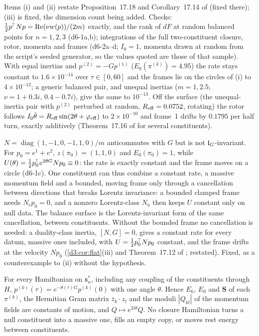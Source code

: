 Items (i) and (ii) restate Proposition~17.18 and Corollary~17.14 of \cite{ES17} (fixed there); (iii) is fixed, the dimension count being added.
Checks: $\tfrac12 p^{\!\top}Np=\operatorname{Re}(\nu w(p))/(2m)$ exactly, and the rank of $dF$ at random balanced points for $n=1,2,3$ (d6-1a,b); integrations of
the full two-constituent closure, rotor, momenta and frames (d6-2a--d; $I_0=1$, momenta drawn at random from the script's seeded generator, so
the values quoted are those of that sample). With equal inertias and $p^{(2)}=-Gp^{(1)}$ ($E_0(\pi^{(k)})=4.95$) the
rate stays constant to $1.6\times10^{-14}$ over $\tau\in[0,60]$ and the frames lie on the circles of (i) to $4\times10^{-12}$; a generic balanced
pair, and unequal inertias ($m=1,2.5$; $\nu=1+0.3i,\,0.4-0.7i$), give the same to $10^{-13}$. Off the surface (the unequal-inertia pair with $p^{(2)}$ perturbed at random, $R_{\rm eff}=0.0752$, rotating) the
rotor follows $I_0\ddot\theta=R_{\rm eff}\sin(2\theta+\varphi_{\rm eff})$ to $2\times10^{-10}$ and frame~1 drifts by $0.1795$ per half turn, exactly
additively (Theorem~17.16 of \cite{ES17} for several constituents).

\begin{remark}
\label{d6:rem:lorentzreq}
$N=\operatorname{diag}(1,-1,0,-1,1,0)/m$ anticommutes with $G$ but is not $\mathfrak l_G$-invariant. For $p_0=e^1+e^2$, $z(\pi_0)=(1,1,0)$ and
$E_0(\pi_0)=1$, while $U(\theta)=\tfrac12 p_0^{\!\top}e^{2\theta G}Np_0\equiv0$: the rate is exactly constant and the frame moves on a circle (d6-1c). One
constituent can thus combine a constant rate, a massive momentum field and a bounded, moving frame only through a cancellation between directions
that breaks Lorentz invariance: a bounded clamped frame needs $N_cp_0=0$, and a nonzero Lorentz-class $N_a$ then keeps $U$ constant only on null
data. The balance surface is the Lorentz-invariant form of the same cancellation, between constituents. Without the bounded frame no cancellation
is needed: a duality-class inertia, $[N,G]=0$, gives a constant rate for every datum, massive ones included, with $U=\tfrac12 p_0^{\!\top}Np_0$ constant,
and the frame drifts at the velocity $Np_0$ (\cref{d3:cor:flat}(iii) and Theorem~17.12 of \cite{ES17}; restated). Fixed, as a counterexample to
(ii) without the hypothesis.
\end{remark}

\begin{corollary}
\label{d6:cor:nopair}
For every Hamiltonian on $\mathfrak s_n^*$, including any coupling of the constituents through $H$, $p^{(k)}(\tau)=e^{-\theta(\tau)G}p^{(k)}(0)$ with
one angle $\theta$. Hence $E_6$, $E_0$ and $\mathbf S$ of each $\pi^{(k)}$, the Hermitian Gram matrix $\bar z_k\cdot z_l$ and the moduli $|Q_{kl}|$
of the momentum fields are constants of motion, and $Q\mapsto e^{2i\theta}Q$. No closure Hamiltonian turns a null constituent into a massive
one, fills an empty copy, or moves rest energy between constituents.
\end{corollary}

